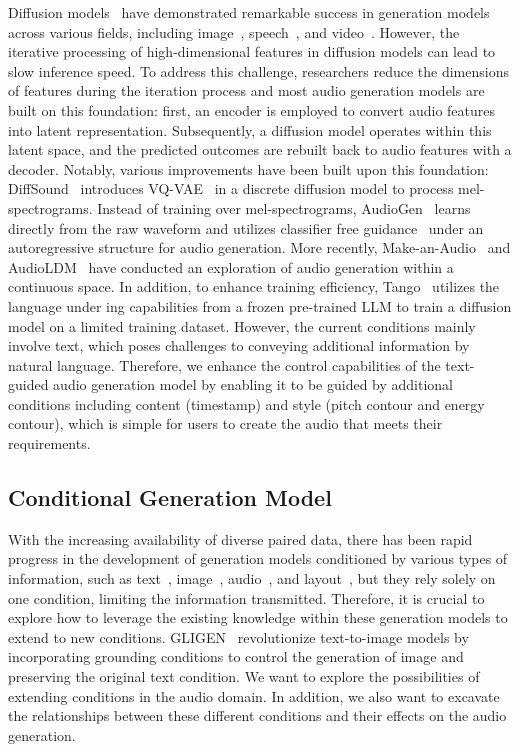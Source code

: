 \documentclass[letterpaper]{article} %
\begin{document}
Diffusion models~\cite{jonathan2020ddpm} have demonstrated remarkable success in generation models across various fields, including image~\cite{chen2020wavegrad}, speech~\cite{kong2021diffwave}, and video~\cite{singer2022makeavideo}. However, the iterative processing of high-dimensional features in diffusion models can lead to slow inference speed. To address this challenge, researchers reduce the dimensions of features during the iteration process and most audio generation models are built on this foundation: first, an encoder is employed to convert audio features into latent representation. Subsequently, a diffusion model operates within this latent space, and the predicted outcomes are rebuilt back to audio features with a decoder. Notably, various improvements have been built upon this foundation: DiffSound~\cite{yang2022diffsound} introduces VQ-VAE~\cite{van2017vqvae} in a discrete diffusion model to process mel-spectrograms. Instead of training over mel-spectrograms, AudioGen~\cite{kreuk2022audiogen} learns directly from the raw waveform and utilizes classifier free guidance~\cite{jonathan2022classfree} under an autoregressive structure for audio generation. More recently, Make-an-Audio~\cite{huang2023makeanaudio} and AudioLDM~\cite{liu2023audioldm} have conducted an exploration of audio generation within a continuous space. In addition, to enhance training efficiency, Tango~\cite{ghosal2023tango} utilizes the language under
ing capabilities from a frozen pre-trained LLM to train a diffusion model on a limited training dataset. However, the current conditions mainly involve text, which poses challenges to conveying additional information by natural language. Therefore, we enhance the control capabilities of the text-guided audio generation model by enabling it to be guided by additional conditions including content (timestamp) and style (pitch contour and energy contour), which is simple for users to create the audio that meets their requirements.

\subsection{Conditional Generation Model}

With the increasing availability of diverse paired data, there has been rapid progress in the development of generation models conditioned by various types of information, such as text~\cite{ramesh2022dalle2,liu2021diffsinger}, image~\cite{huang2023makeanaudio,li2023blip2}, audio~\cite{zelaszczyk2021audiotoimage,wang2023one}, and
layout~\cite{jahn2021highresolutioncs,li2021lama}, but they rely solely on one condition, limiting the information transmitted. Therefore, it is crucial to explore how to leverage the existing knowledge within these generation models to extend to new conditions. GLIGEN~\cite{li2023gligen} revolutionize text-to-image models by incorporating grounding conditions to control the generation of image and preserving the original text condition. We want to explore the possibilities of extending conditions in the audio domain. In addition, we also want to excavate the relationships between these different conditions and their effects on the audio generation.
\end{document}
